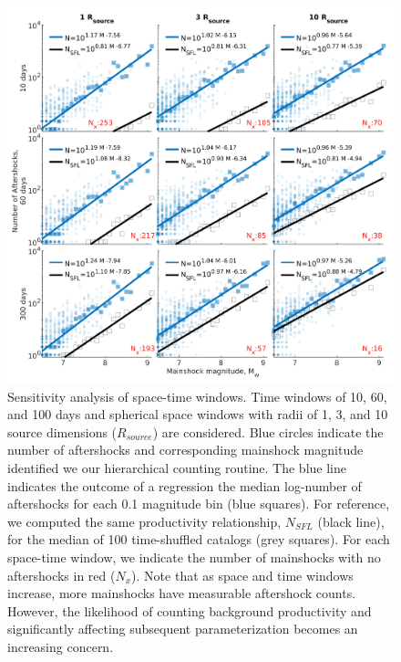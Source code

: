 \documentclass[draft]{agujournal2018}
\begin{document}
\begin{figure}
    \centering
    \includegraphics{figures/sensitivity.png}
    \caption{Sensitivity analysis of space-time windows. Time windows of 10, 60, and 100 days and spherical space windows with radii of 1, 3, and 10 source dimensions ($R_{source}$) are considered. Blue circles indicate the number of aftershocks and corresponding mainshock magnitude identified we our hierarchical counting routine. The blue line indicates the outcome of a regression the median log-number of aftershocks for each 0.1 magnitude bin (blue squares). For reference, we computed the same productivity relationship, $N_{SFL}$ (black line), for the median of 100 time-shuffled catalogs (grey squares). For each space-time window, we indicate the number of mainshocks with no aftershocks in red ($N_x$). Note that as space and time windows increase, more mainshocks have measurable aftershock counts. However, the likelihood of counting background productivity and significantly affecting subsequent parameterization becomes an increasing concern.
}
    \label{fig:sensitivity}
\end{figure} 
\end{document}
